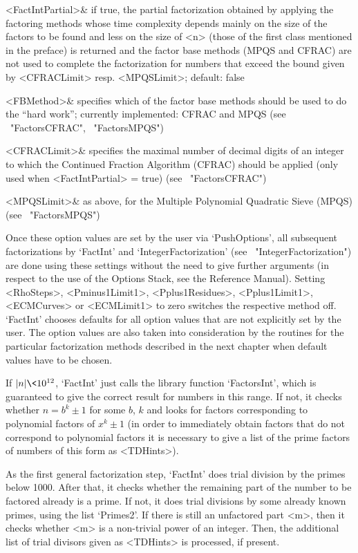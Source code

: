    <FactIntPartial>& if true, the partial factorization obtained
   by applying the factoring methods whose time complexity depends
   mainly on the size of the factors to be found and less
   on the size of <n> (those of the first class mentioned
   in the preface) is returned and the factor base methods
   (MPQS and CFRAC) are not used to complete the factorization
   for numbers that exceed the bound given by <CFRACLimit> 
   resp. <MPQSLimit>; default: false

   <FBMethod>& specifies which of the factor base methods should be
   used to do the ``hard work''; currently implemented: CFRAC and MPQS
   (see ~"FactorsCFRAC", ~"FactorsMPQS")

   <CFRACLimit>& specifies the maximal number of decimal digits of
   an integer to which the Continued Fraction Algorithm (CFRAC) 
   should be applied (only used when <FactIntPartial> = true)
   (see ~"FactorsCFRAC")

   <MPQSLimit>& as above, for the Multiple Polynomial Quadratic 
   Sieve (MPQS) (see ~"FactorsMPQS")
\enditems

Once these option values are set by the user via `PushOptions',
all subsequent factorizations
by `FactInt' and `IntegerFactorization' (see ~"IntegerFactorization")
are done using these settings without the need
to give further arguments (in respect to the use of the
{\GAP} Options Stack, see the Reference Manual).
Setting <RhoSteps>, <Pminus1Limit1>, <Pplus1Residues>, <Pplus1Limit1>,
<ECMCurves> or <ECMLimit1> to zero switches the respective method off.
`FactInt' chooses defaults for all option values that are 
not explicitly set by the user.
The option values are also taken into consideration by the routines for
the particular factorization methods described in the next chapter
when default values have to be chosen. 

If $|n| \< 10^{12}$, `FactInt' just calls the library function
`FactorsInt', which is guaranteed to give the correct result for
numbers in this range. If not, it checks whether $n = b^k \pm 1$ for 
some $b$, $k$ and looks for factors corresponding to
polynomial factors of $x^k \pm 1$ (in order to immediately 
obtain factors that do not correspond to polynomial factors  
it is necessary to give a list of the prime factors of numbers
of this form as <TDHints>).  

As the first general factorization step, `FactInt' does 
trial division by the primes below 1000. 
After that, it checks whether the remaining
part of the number to be factored already is a prime.
If not, it does trial divisions by some already known primes, using
the list `Primes2'.
If there is still an unfactored part <m>, then it checks whether <m>
is a non-trivial power of an integer.
Then, the additional list of trial divisors given
as <TDHints> is processed, if present.

